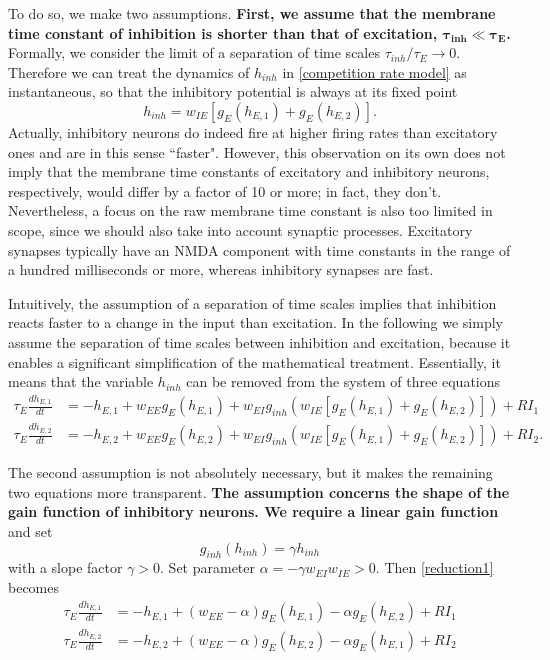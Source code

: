 \documentclass[12pt,hyperref,a4paper,UTF8]{ctexart}
\begin{document}
To do so, we make two assumptions. \textbf{First, we assume that the membrane time constant of inhibition is shorter than that of excitation, $\mathbf{\tau_{inh} \ll \tau_{E}}$.} Formally, we consider the limit of a separation of time scales $\tau_{inh} / \tau_{E} \to 0$. Therefore we can treat the dynamics of $h_{inh}$ in \autoref{competition rate model} as instantaneous, so that the inhibitory potential is always at its fixed point
$$h_{inh}=w_{IE}[g_E (h_{E,1})+g_E (h_{E,2})].$$
Actually, inhibitory neurons do indeed fire at higher firing rates than excitatory ones and are in this sense ``faster". However, this observation on its own does not imply that the membrane time constants of excitatory and inhibitory neurons, respectively, would differ by a factor of 10 or more; in fact, they don’t. Nevertheless, a focus on the raw membrane time constant is also too limited in scope, since we should also take into account synaptic processes. Excitatory synapses typically have an NMDA component with time constants in the range of a hundred milliseconds or more, whereas inhibitory synapses are fast.

Intuitively, the assumption of a separation of time scales implies that inhibition reacts faster to a change in the input than excitation. In the following we simply assume the separation of time scales between inhibition and excitation, because it enables a significant simplification of the mathematical treatment. Essentially, it means that the variable $h_{inh}$ can be removed from the system of three equations
\begin{equation}
    \begin{aligned}
        \tau_E \frac{dh_{E,1}}{dt}&=-h_{E,1}+w_{EE}g_E (h_{E,1})+w_{EI}g_{inh} (w_{IE}[g_E (h_{E,1})+g_E (h_{E,2})])+RI_1\\
        \tau_E \frac{dh_{E,2}}{dt}&=-h_{E,2}+w_{EE}g_E (h_{E,2})+w_{EI}g_{inh} (w_{IE}[g_E (h_{E,1})+g_E (h_{E,2})])+RI_2.
    \end{aligned}
\end{equation}\label{reduction1}

The second assumption is not absolutely necessary, but it makes the remaining two equations more transparent. \textbf{The assumption concerns the shape of the gain function of inhibitory neurons. We require a linear gain function} and set
$$g_{inh}(h_{inh})=\gamma h_{inh}$$
with a slope factor $\gamma > 0$. Set parameter $\alpha=-\gamma w_{EI}w_{IE}>0$. Then \autoref{reduction1} becomes
\begin{equation}
    \begin{aligned}
        \tau_E \frac{dh_{E,1}}{dt}&=-h_{E,1}+(w_{EE}-\alpha)g_E (h_{E,1})-\alpha g_E (h_{E,2})+RI_1\\
        \tau_E \frac{dh_{E,2}}{dt}&=-h_{E,2}+(w_{EE}-\alpha)g_E (h_{E,2})-\alpha g_E (h_{E,1})+RI_2
    \end{aligned}
\end{equation}\label{reduction2}
\end{document}
